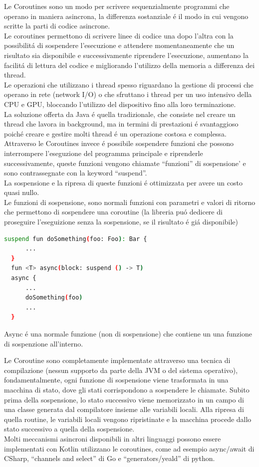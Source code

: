 Le Coroutines sono un modo per scrivere sequenzialmente programmi che operano in maniera asincrona, la differenza sostanziale \'e il modo in cui vengono scritte la parti di codice asincrone.\\
Le coroutines permettono di scrivere linee di codice una dopo l'altra con la possibilit\'a di sospendere l'esecuzione e attendere momentaneamente che un risultato sia disponibile e successivamente riprendere l'esecuzione, aumentano la facilit\'a di lettura del codice e migliorando l'utilizzo della memoria a differenza dei thread.\\
Le operazioni che utilizzano i thread spesso riguardano la gestione di processi che operano in rete (network I/O) o che sfruttano i thread per un uso intensivo della CPU e GPU, bloccando l'utilizzo del dispositivo fino alla loro terminazione.\\
La soluzione offerta da Java \'e quella tradizionale, che consiste nel creare un thread che lavora in background, ma in termini di prestazioni \'e svantaggioso poich\'e creare e gestire molti thread \'e un operazione costosa e complessa.\\
Attraverso le Coroutines invece \'e possibile sospendere funzioni che possono interrompere l'eseguzione del programma principale e riprenderle successivamente, queste funzioni vengono chiamate ``funzioni'' di sospensione' e sono contrassegnate con la keyword ``suspend''.\\
La sospensione e la ripresa di queste funzioni \'e ottimizzata per avere un costo quasi nullo.\\

Le funzioni di sospensione, sono normali funzioni con parametri e valori di ritorno che permettono di sospendere una coroutine (la libreria pu\'o dedicere di proseguire l'eseguizione senza la sospensione, se il risultato \'e gi\'a disponibile)

\begin{lstlisting}[language=bash,caption={Kotlin Coroutines }]
  suspend fun doSomething(foo: Foo): Bar {
      ...
  }
  fun <T> async(block: suspend () -> T)
  async {
      ...
      doSomething(foo)
      ...
  }

\end{lstlisting}

Async \'e una normale funzione (non di sospensione) che contiene un una funzione di sospenzione all'interno.

Le Coroutine sono completamente implementate attraverso una tecnica di compilazione (nessun supporto da parte della JVM o del sistema operativo), fondamentalmente, ogni funzione di sospensione viene trasformata in una macchina di stato, dove gli stati corrispondono a sospendere le chiamate. Subito prima della sospensione, lo stato successivo viene memorizzato in un campo di una classe generata dal compilatore insieme alle variabili locali. Alla ripresa di quella routine, le variabili locali vengono ripristinate e la macchina procede dallo stato successivo a quella della sospensione.\\
Molti meccanismi asincroni disponibili in altri linguaggi possono essere implementati con Kotlin utilizzano le coroutines, come ad esempio async/await di CSharp, ``channels and select'' di Go e ``generators/yeald'' di python.


